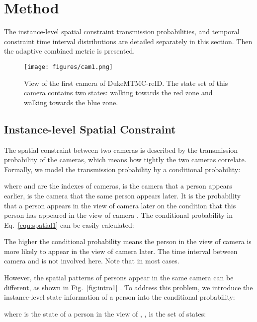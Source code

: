\documentclass[10pt,twocolumn,letterpaper]{article}
\begin{document}
\section{Method}

The instance-level spatial constraint \ie transmission probabilities, and temporal constraint \ie time interval distributions are detailed separately in this section.
Then the adaptive combined metric is presented.



\begin{figure}[t]
\begin{center}
   \texttt{[image: figures/cam1.png]}
\end{center}
   \caption {View of the first camera of DukeMTMC-reID. The state set of this camera contains two states: walking towards the red zone and walking towards the blue zone.}
\label{fig:cam1}
\vspace{-0.3cm}
\end{figure}


\subsection{Instance-level Spatial Constraint}

The spatial constraint between two cameras is described by the transmission probability of the cameras, which means how tightly the two cameras correlate. Formally, we model the transmission probability by a conditional probability:

where  and  are the indexes of cameras,  is the camera that a person appears earlier,  is the camera that the same person appears later.
It is the probability that a person appears in the view of camera  later on the condition that this person has appeared in the view of camera .
The conditional probability in Eq.~\ref{equ:spatial1} can be easily calculated:


The higher the conditional probability means the person in the view of camera  is more likely to appear in the view of camera  later. The time interval between camera  and  is not involved here. Note that  in most cases.

However, the spatial patterns of persons appear in the same camera can be different, as shown in Fig.~\ref{fig:intro1} . To address this problem, we introduce the instance-level state information of a person into the conditional probability:

where  is the state of a person in the view of , ,  is the set of states: 
\end{document}

